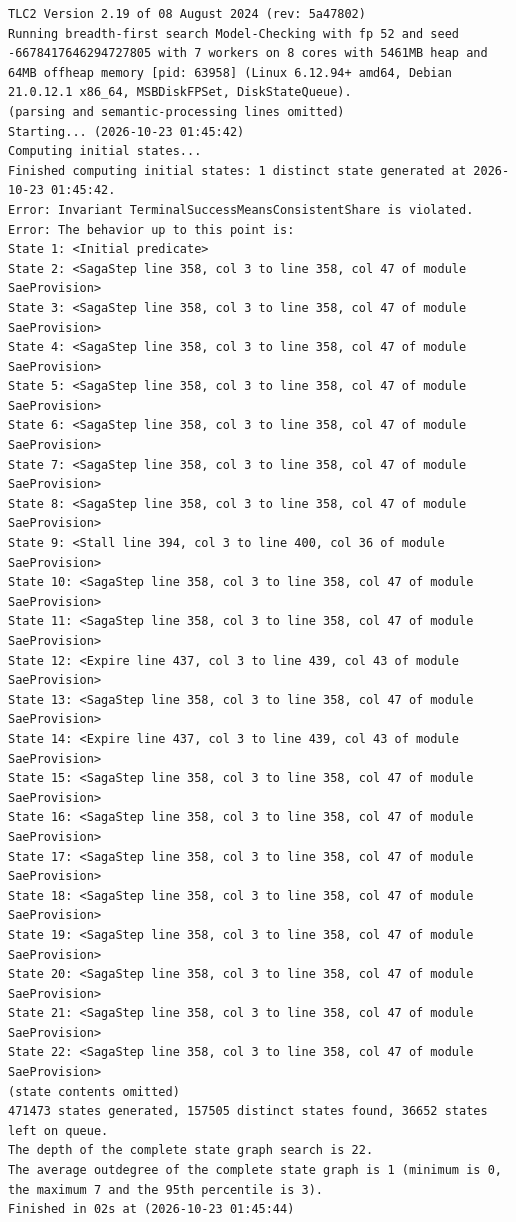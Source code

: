\documentclass[11pt,a4paper]{article}
\begin{document}
\begin{lstlisting}[float, caption={mutations/mut\_e\_noleaseguard.cfg result}, captionpos=t, label={lst:tlc-mut-e-noleaseguard}]
TLC2 Version 2.19 of 08 August 2024 (rev: 5a47802)
Running breadth-first search Model-Checking with fp 52 and seed -6678417646294727805 with 7 workers on 8 cores with 5461MB heap and 64MB offheap memory [pid: 63958] (Linux 6.12.94+ amd64, Debian 21.0.12.1 x86_64, MSBDiskFPSet, DiskStateQueue).
(parsing and semantic-processing lines omitted)
Starting... (2026-10-23 01:45:42)
Computing initial states...
Finished computing initial states: 1 distinct state generated at 2026-10-23 01:45:42.
Error: Invariant TerminalSuccessMeansConsistentShare is violated.
Error: The behavior up to this point is:
State 1: <Initial predicate>
State 2: <SagaStep line 358, col 3 to line 358, col 47 of module SaeProvision>
State 3: <SagaStep line 358, col 3 to line 358, col 47 of module SaeProvision>
State 4: <SagaStep line 358, col 3 to line 358, col 47 of module SaeProvision>
State 5: <SagaStep line 358, col 3 to line 358, col 47 of module SaeProvision>
State 6: <SagaStep line 358, col 3 to line 358, col 47 of module SaeProvision>
State 7: <SagaStep line 358, col 3 to line 358, col 47 of module SaeProvision>
State 8: <SagaStep line 358, col 3 to line 358, col 47 of module SaeProvision>
State 9: <Stall line 394, col 3 to line 400, col 36 of module SaeProvision>
State 10: <SagaStep line 358, col 3 to line 358, col 47 of module SaeProvision>
State 11: <SagaStep line 358, col 3 to line 358, col 47 of module SaeProvision>
State 12: <Expire line 437, col 3 to line 439, col 43 of module SaeProvision>
State 13: <SagaStep line 358, col 3 to line 358, col 47 of module SaeProvision>
State 14: <Expire line 437, col 3 to line 439, col 43 of module SaeProvision>
State 15: <SagaStep line 358, col 3 to line 358, col 47 of module SaeProvision>
State 16: <SagaStep line 358, col 3 to line 358, col 47 of module SaeProvision>
State 17: <SagaStep line 358, col 3 to line 358, col 47 of module SaeProvision>
State 18: <SagaStep line 358, col 3 to line 358, col 47 of module SaeProvision>
State 19: <SagaStep line 358, col 3 to line 358, col 47 of module SaeProvision>
State 20: <SagaStep line 358, col 3 to line 358, col 47 of module SaeProvision>
State 21: <SagaStep line 358, col 3 to line 358, col 47 of module SaeProvision>
State 22: <SagaStep line 358, col 3 to line 358, col 47 of module SaeProvision>
(state contents omitted)
471473 states generated, 157505 distinct states found, 36652 states left on queue.
The depth of the complete state graph search is 22.
The average outdegree of the complete state graph is 1 (minimum is 0, the maximum 7 and the 95th percentile is 3).
Finished in 02s at (2026-10-23 01:45:44)
\end{lstlisting}
\bigskip
\end{document}
